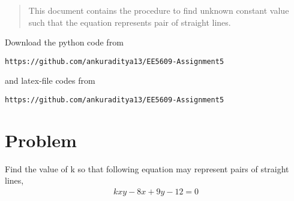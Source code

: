 \documentclass[journal,12pt,twocolumn]{IEEEtran}
\begin{document}
\begin{abstract}
This document contains the procedure to find unknown constant value such that the equation represents pair of straight lines.
\end{abstract}
Download the python code from 
\begin{lstlisting}
https://github.com/ankuraditya13/EE5609-Assignment5
\end{lstlisting}
%
and latex-file codes from 
%
\begin{lstlisting}
https://github.com/ankuraditya13/EE5609-Assignment5
\end{lstlisting}

\section{Problem}
Find the value of k so that following equation may represent pairs of straight lines,
\begin{align}
kxy-8x+9y-12 = 0
\label{Q_eq}
\end{align}
\end{document}
